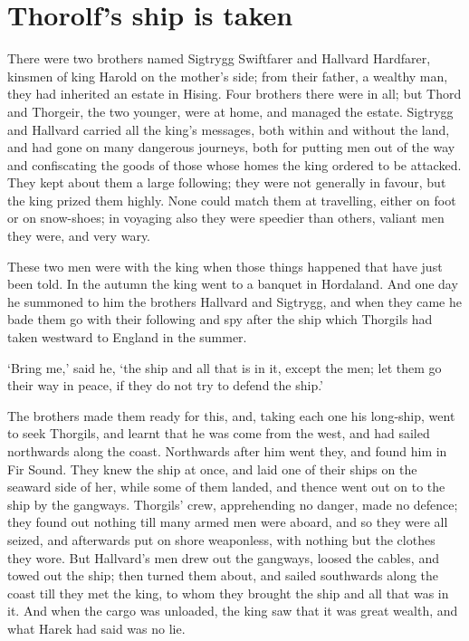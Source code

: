 \chapter{Thorolf's ship is taken}
There were two brothers named Sigtrygg Swiftfarer and Hallvard Hardfarer, kinsmen of king Harold on the mother's side; from their father, a wealthy man, they had inherited an estate in Hising. Four brothers there were in all; but Thord and Thorgeir, the two younger, were at home, and managed the estate. Sigtrygg and Hallvard carried all the king's messages, both within and without the land, and had gone on many dangerous journeys, both for putting men out of the way and confiscating the goods of those whose homes the king ordered to be attacked. They kept about them a large following; they were not generally in favour, but the king prized them highly. None could match them at travelling, either on foot or on snow-shoes; in voyaging also they were speedier than others, valiant men they were, and very wary.

These two men were with the king when those things happened that have just been told. In the autumn the king went to a banquet in Hordaland. And one day he summoned to him the brothers Hallvard and Sigtrygg, and when they came he bade them go with their following and spy after the ship which Thorgils had taken westward to England in the summer.

`Bring me,' said he, `the ship and all that is in it, except the men; let them go their way in peace, if they do not try to defend the ship.'

The brothers made them ready for this, and, taking each one his long-ship, went to seek Thorgils, and learnt that he was come from the west, and had sailed northwards along the coast. Northwards after him went they, and found him in Fir Sound. They knew the ship at once, and laid one of their ships on the seaward side of her, while some of them landed, and thence went out on to the ship by the gangways. Thorgils' crew, apprehending no danger, made no defence; they found out nothing till many armed men were aboard, and so they were all seized, and afterwards put on shore weaponless, with nothing but the clothes they wore. But Hallvard's men drew out the gangways, loosed the cables, and towed out the ship; then turned them about, and sailed southwards along the coast till they met the king, to whom they brought the ship and all that was in it. And when the cargo was unloaded, the king saw that it was great wealth, and what Harek had said was no lie.


